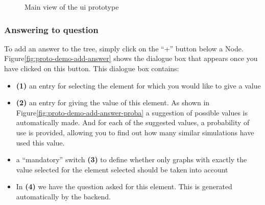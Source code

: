     \begin{figure}[h]
    \centering
    \caption{\label{fig:proto-demo}  Main view of the \acrshort{ui} prototype}
    \end{figure}
    
    
    \subsubsection{Answering to question}
    To add an answer to the tree, simply click on the “+” button below a Node. Figure\ref{fig:proto-demo-add-answer} shows the dialogue box that appears once you have clicked on this button. This dialogue box contains:
    
    \begin{itemize}
        \item \textbf{(1)} an entry for selecting the element for which you would like to give a value
        \item \textbf{(2)} an entry for giving the value of this element. As shown in Figure\ref{fig:proto-demo-add-answer-proba} a suggestion of possible values is automatically made. And for each of the suggested values, a probability of use is provided, allowing you to find out how many similar simulations have used this value.
        \item a “mandatory” switch \textbf{(3)} to define whether only graphs with exactly the value selected for the element selected should be taken into account
        \item In \textbf{(4)} we have the question asked for this element. This is generated automatically by the backend.
    \end{itemize}
    


